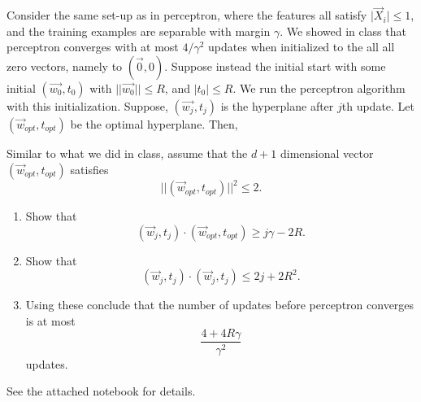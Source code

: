 \documentclass[11pt]{article}
\newenvironment{problem}[2][Problem]{\begin{trivlist}
\item[\hskip \labelsep {\bfseries #1}\hskip \labelsep {\bfseries #2.}]}{\end{trivlist}}
\begin{document}
\begin{problem}{ 3. (15 points)}
Consider the same set-up as in perceptron, where the features all satisfy $\lvert\overrightarrow X_i \rvert\le 1$, and the training examples are separable with margin $\gamma$. We showed in class that perceptron converges with at most $4/\gamma^2$ updates when initialized to the all all zero vectors, namely to $(\overrightarrow 0, 0)$. Suppose instead the initial start with some initial $(\overrightarrow {w_0}, t_0)$ with $\lvert\lvert \overrightarrow {w_0}\rvert \rvert \le R$, and $|t_0|\le R$. We run the perceptron algorithm with this initialization. Suppose, $(\overrightarrow {w_j}, t_j)$ is the hyperplane after $j$th update. Let $(\overrightarrow{w}_{opt}, t_{opt})$ be the optimal hyperplane. Then, 


Similar to what we did in class, assume that the $d+1$ dimensional vector $(\overrightarrow{w}_{opt}, t_{opt})$ satisfies
\[
\lvert\lvert(\overrightarrow{w}_{opt}, t_{opt})\rvert\rvert^2 \le 2. 
\]
\begin{enumerate}
\item Show that 
\[
(\overrightarrow{w}_{j}, t_{j})\cdot (\overrightarrow{w}_{opt}, t_{opt})\ge j\gamma-2R.
\]
\item Show that 
\[
(\overrightarrow{w}_{j}, t_{j})\cdot (\overrightarrow{w}_{j}, t_{j})\le 2j+2R^2.
\]
\item
Using these conclude that the number of updates before perceptron converges is at most
\[
\frac{4+4R\gamma}{\gamma^2}
\]
updates.
\end{enumerate}

\end{problem}



\begin{problem}{4 (25 points)}
See the attached notebook for details.
\end{problem}
\end{document}
